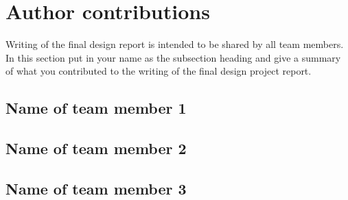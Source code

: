 \documentclass[fleqn,10pt]{project}
\begin{document}
\section{Author contributions}
Writing of  the final design report is intended to be shared by all team members.  
In this section put in your name as the subsection heading and give a summary of 
what you contributed to the writing of the final design project report. 
\subsection{Name of team member 1}
\subsection{Name of team member 2}
\subsection{Name of team member 3}
\end{document}
